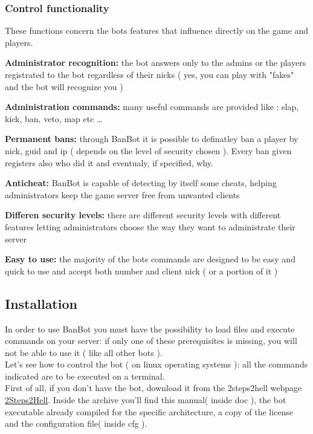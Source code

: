 \documentclass[a4paper]{article}
\begin{document}
\subsubsection {Control functionality}
These functions concern the bots features that influence directly on the game and players.
\begin{description}
\item{\textbf{Administrator recognition:}} the bot answers only to the admins or the players registrated to the bot regardless of their nicks ( yes, you can play with
"fakes" and the bot will recognize you )
\item{\textbf{Administration commands:}} many useful commands are provided like : slap, kick, ban, veto, map etc \dots
\item{\textbf{Permanent bans:}} through BanBot it is possible to definatley ban a player by nick, guid and ip ( depends on the level of security chosen ). Every
ban given registers also who did it and eventualy, if specified, why.
\item{\textbf{Anticheat:}} BanBot is capable of detecting by itself some cheats, helping administrators keep the game server free from unwanted clients
\item{\textbf{Differen security levels:}} there are different security levels with different features letting administrators choose the way they want to
administrate their server
\item{\textbf{Easy to use:}} the majority of the bots commands are designed to be easy and quick to use and accept both number and client nick ( or a
portion of it )
\end{description}

\newpage
\subsection {Installation}
In order to use BanBot you must have the possibility to load files and execute commands on your server: if only one of these prerequisites is missing, you will not
be able to use it ( like all other bots ).\\

Let's see how to control the bot ( on linux operating systems ): all the commands indicated are to be executed on a terminal.\\

First of all, if you don't have the bot, download it from the 2steps2hell webpage \href{http://www.x2s2hx.altervista.org/2steps-2hell-banbot.php}{2Steps2Hell}.
Inside the archive you'll find this manual( inside doc ), the bot executable already compiled for the specific architecture, a copy of the license and the configuration
file( inside cfg ).
\end{document}
